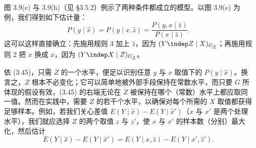 图 3.9(e) 与 3.9(h)（见 \S 3.5.2）例示了两种条件都成立的模型。以图 3.9(e) 为例，我们得到如下估计量：
\begin{equation}
P(y\mid\hat{x})=P(y\mid x,\hat{z})=\frac{P(y,x\mid\hat{z})}{P(x\mid\hat{z})}. \tag{3.45}
\end{equation}
这可以这样直接确立：先施用规则 3 加上 $\hat{z}$，因为 $(Y\indep Z\mid X)_{G_{\underline{Z}}}$；再施用规则 2 把 $\hat{x}$ 换成 $x$，因为 $(Y\indep X\mid Z)_{G_{\underline{Z}}}$。

依 \textup{(3.45)}，只需 $Z$ 的一个水平，便足以识别任意 $y$ 与 $x$ 取值下的 $P(y\mid\hat{x})$。换言之，$Z$ 根本不必变化；它可以简单地被外部手段保持在常数水平，而只要 $G$ 所体现的假设有效，\textup{(3.45)} 的右端无论在 $Z$ 被保持在哪个（常数）水平上都应取同一值。然而在实践中，需要 $Z$ 的若干个水平，以确保对每个所需的 $X$ 取值都获得足够样本。例如，若我们关心差值 $E(Y\mid\hat{x})-E(Y\mid\hat{x}')$（$x$ 与 $x'$ 是两个处理水平），我们就应选择 $Z$ 的两个取值 $z$ 与 $z'$，使 $x$ 与 $x'$ 的样本数（分别）最大化，然后估计
\[
E(Y\mid\hat{x})-E(Y\mid\hat{x}')=E(Y\mid x,\hat{z})-E(Y\mid x',\hat{z}').
\]
